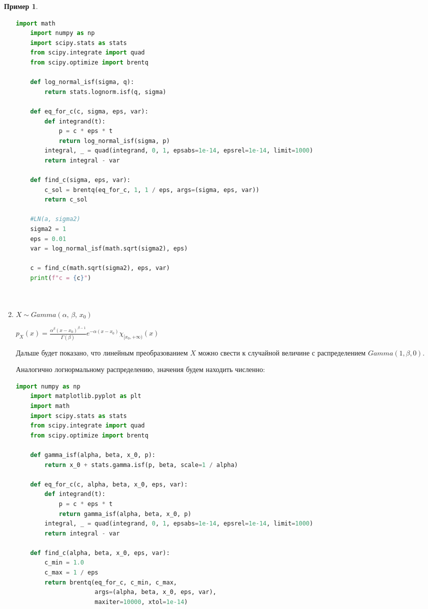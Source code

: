 \documentclass[12pt]{article}
\theoremstyle{plain}
\theoremstyle{definition}
\newtheorem{example}{Пример}[section]
\theoremstyle{remark}
\begin{document}
\begin{example}
\begin{enumerate}
    \begin{lstlisting}[language=Python, gobble = 4]
    import math
    import numpy as np
    import scipy.stats as stats
    from scipy.integrate import quad
    from scipy.optimize import brentq
    
    def log_normal_isf(sigma, q):
        return stats.lognorm.isf(q, sigma) 
        
    def eq_for_c(c, sigma, eps, var):
        def integrand(t):
            p = c * eps * t
            return log_normal_isf(sigma, p)
        integral, _ = quad(integrand, 0, 1, epsabs=1e-14, epsrel=1e-14, limit=1000)
        return integral - var
    
    def find_c(sigma, eps, var):
        c_sol = brentq(eq_for_c, 1, 1 / eps, args=(sigma, eps, var))
        return c_sol
    
    #LN(a, sigma2)
    sigma2 = 1
    eps = 0.01
    var = log_normal_isf(math.sqrt(sigma2), eps)
    
    c = find_c(math.sqrt(sigma2), eps, var)
    print(f"c = {c}")

    
    \end{lstlisting}

    \item $X \sim Gamma(\alpha,\, \beta,\, x_0)$

    $p_X(x) = \frac{\alpha^\beta(x-x_0)^{\beta - 1}}{\Gamma(\beta)}e^{-\alpha(x-x_0)} \chi_{[x_0,+\infty)}(x)$

    Дальше будет показано, что линейным преобразованием $X$ можно свести к случайной величине с распределением $Gamma(1, \beta, 0)$.

    Аналогично логнормальному распределению, значения будем находить численно:    
    \begin{lstlisting}[language=Python, gobble = 4]
    import numpy as np
    import matplotlib.pyplot as plt
    import math
    import scipy.stats as stats
    from scipy.integrate import quad
    from scipy.optimize import brentq
    
    def gamma_isf(alpha, beta, x_0, p):
        return x_0 + stats.gamma.isf(p, beta, scale=1 / alpha)
    
    def eq_for_c(c, alpha, beta, x_0, eps, var):
        def integrand(t):
            p = c * eps * t
            return gamma_isf(alpha, beta, x_0, p)
        integral, _ = quad(integrand, 0, 1, epsabs=1e-14, epsrel=1e-14, limit=1000)
        return integral - var
    
    def find_c(alpha, beta, x_0, eps, var):
        c_min = 1.0
        c_max = 1 / eps  
        return brentq(eq_for_c, c_min, c_max,
                      args=(alpha, beta, x_0, eps, var),
                      maxiter=10000, xtol=1e-14)
    

\end{lstlisting}
\end{enumerate}
\end{example}
\end{document}
